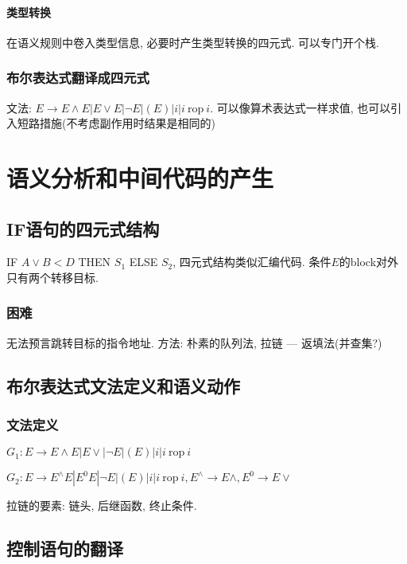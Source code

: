                 \paragraph{类型转换}
                    在语义规则中卷入类型信息, 必要时产生类型转换的四元式. 可以专门开个栈.

            \subsubsection{布尔表达式翻译成四元式}

                文法: $E\to E\wedge E|E\vee E|\neg E|(E)|i|i\mathrm{\ rop\ }i$. 可以像算术表达式一样求值, 也可以引入短路措施(不考虑副作用时结果是相同的)


\section{语义分析和中间代码的产生}

    \subsection{IF语句的四元式结构}

        IF $A\vee B<D$ THEN $S_1$ ELSE $S_2$, 四元式结构类似汇编代码. 条件$E$的block对外只有两个转移目标.

        \subsubsection{困难}

            无法预言跳转目标的指令地址. 方法: 朴素的队列法, 拉链 --- 返填法(并查集?)

    \subsection{布尔表达式文法定义和语义动作}

        \subsubsection{文法定义}

            $G_1:E\to E\wedge E|E\vee|\neg E|(E)|i|i\mathrm{\ rop\ }i$

            $G_2:E\to E^\wedge E|E^0 E|\neg E|(E)|i|i\mathrm{\ rop\ }i, E^\wedge\to E\wedge, E^0\to E\vee$

            拉链的要素: 链头, 后继函数, 终止条件.

    \subsection{控制语句的翻译}


